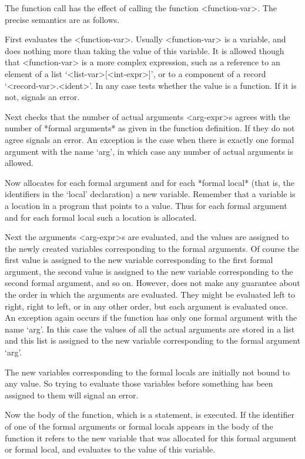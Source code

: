 {The function call has the effect of calling the function <function-var>.
The precise semantics are as follows.

First {\GAP} evaluates the <function-var>.
Usually <function-var> is a variable,
and {\GAP} does nothing more than taking the value of this variable.
It is allowed though that <function-var> is a more complex expression,
such as a reference to an element of a list `<list-var>[<int-expr>]',
or to a component of a record `<record-var>.<ident>'.
In any case {\GAP} tests whether the value is a function.
If it is not, {\GAP} signals an error.

Next {\GAP} checks that the number of actual arguments <arg-expr>s agrees
with the number of *formal arguments* as given in the function definition.
If they do not agree {\GAP} signals an error. An exception is the case
when there is exactly one formal argument with the name `arg', in which
case any number of actual arguments is allowed.

Now {\GAP} allocates for each formal argument and for each *formal local*
(that is, the identifiers in the `local' declaration) a new variable.
Remember that a variable is a location in a {\GAP} program
that points to a value. Thus for  each formal argument and for each
formal local such a location is allocated.

Next the arguments <arg-expr>s are evaluated, and the values are assigned
to the newly created variables corresponding to the formal arguments. Of
course the first value is assigned to the new variable corresponding to
the first formal argument, the second  value  is assigned to the new
variable corresponding  to  the second  formal argument, and  so on.
However, {\GAP} does not make any guarantee about the order in which the
arguments are evaluated. They might be evaluated left to right, right to
left, or in any other order, but each argument is evaluated once. An
exception again occurs if the function has only one formal argument with
the name `arg'. In this case the values of all the actual arguments are
stored in  a list and this  list is assigned to the  new variable
corresponding to the formal argument `arg'.

The new variables corresponding to the formal locals are initially not
bound to any  value.  So trying  to evaluate those  variables before
something has been assigned to them will signal an error.

Now the body of the function, which is a statement, is executed. If the
identifier of one of the formal arguments or formal locals appears in the
body of the function it refers to the new variable that was allocated for
this formal argument or formal local, and evaluates to the value of this
variable.

}
